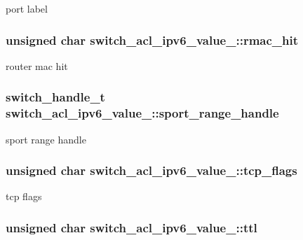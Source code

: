port label \hypertarget{unionswitch__acl__ipv6__value___a7f8d7fa2eb138467c3938e0f99e584a0}{
\subsubsection[{rmac\+\_\+hit}]{\setlength{\rightskip}{0pt plus 5cm}unsigned char switch\+\_\+acl\+\_\+ipv6\+\_\+value\+\_\+\+::rmac\+\_\+hit}}\label{unionswitch__acl__ipv6__value___a7f8d7fa2eb138467c3938e0f99e584a0}
router mac hit \hypertarget{unionswitch__acl__ipv6__value___ac90b3a5195c217ed92124c9c8a2ba01c}{
\subsubsection[{sport\+\_\+range\+\_\+handle}]{\setlength{\rightskip}{0pt plus 5cm}switch\+\_\+handle\+\_\+t switch\+\_\+acl\+\_\+ipv6\+\_\+value\+\_\+\+::sport\+\_\+range\+\_\+handle}}\label{unionswitch__acl__ipv6__value___ac90b3a5195c217ed92124c9c8a2ba01c}
sport range handle \hypertarget{unionswitch__acl__ipv6__value___ae3850202d3b09d3252de22f21c7b2695}{
\subsubsection[{tcp\+\_\+flags}]{\setlength{\rightskip}{0pt plus 5cm}unsigned char switch\+\_\+acl\+\_\+ipv6\+\_\+value\+\_\+\+::tcp\+\_\+flags}}\label{unionswitch__acl__ipv6__value___ae3850202d3b09d3252de22f21c7b2695}
tcp flags \hypertarget{unionswitch__acl__ipv6__value___aa3124a89a9b528df652e286da4500a7b}{
\subsubsection[{ttl}]{\setlength{\rightskip}{0pt plus 5cm}unsigned char switch\+\_\+acl\+\_\+ipv6\+\_\+value\+\_\+\+::ttl}}\label{unionswitch__acl__ipv6__value___aa3124a89a9b528df652e286da4500a7b}

